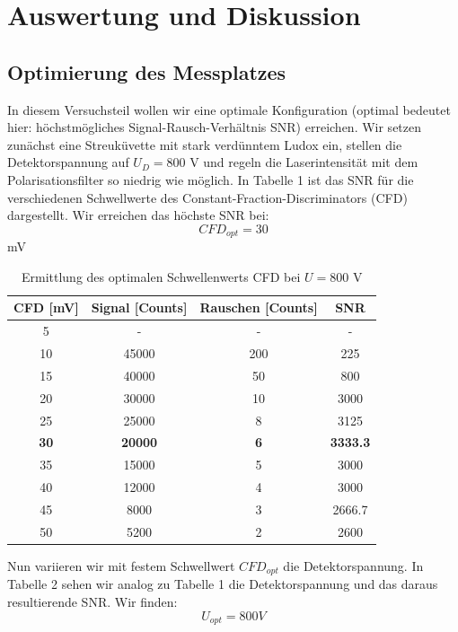 \documentclass{article}
\begin{document}
\section{Auswertung und Diskussion}
\subsection{Optimierung des Messplatzes}
In diesem Versuchsteil wollen wir eine optimale Konfiguration (optimal bedeutet hier: höchstmögliches
Signal-Rausch-Verhältnis SNR) erreichen. Wir setzen zunächst eine Streuküvette mit stark verdünntem
Ludox ein, stellen die Detektorspannung auf $U_D=800$ V und regeln die Laserintensität mit dem Polarisationsfilter so niedrig
wie möglich. In Tabelle 1 ist das SNR für die verschiedenen Schwellwerte des Constant-Fraction-Discriminators (CFD) dargestellt.
Wir erreichen das höchste SNR bei: $$CFD_{opt}=30$$ mV

\begin{table}[h]
  \centering
  \begin{tabular}{c|c|c|c}
    CFD [mV] & Signal [Counts] & Rauschen [Counts] & SNR \\
    \hline
    5       &     -          & -                & -\\
    10      & 45000          & 200              & 225\\
    15      & 40000          & 50               & 800\\
    20      & 30000          & 10               & 3000\\
    25      & 25000          & 8                & 3125\\
    \textbf{30}      & \textbf{20000}          & \textbf{6}                & \textbf{3333.3}\\
    35      & 15000          & 5                & 3000\\
    40      & 12000          & 4                & 3000\\
    45      & 8000           & 3                & 2666.7\\
    50      & 5200           & 2                & 2600\\
  \end{tabular}
  \caption{Ermittlung des optimalen Schwellenwerts CFD bei $U=800$ V}
\end{table}

Nun variieren wir mit festem Schwellwert $CFD_{opt}$ die Detektorspannung. In Tabelle 2 sehen wir analog zu
Tabelle 1 die Detektorspannung und das daraus resultierende SNR. Wir finden: $$ U_{opt}=800 V$$
\end{document}
